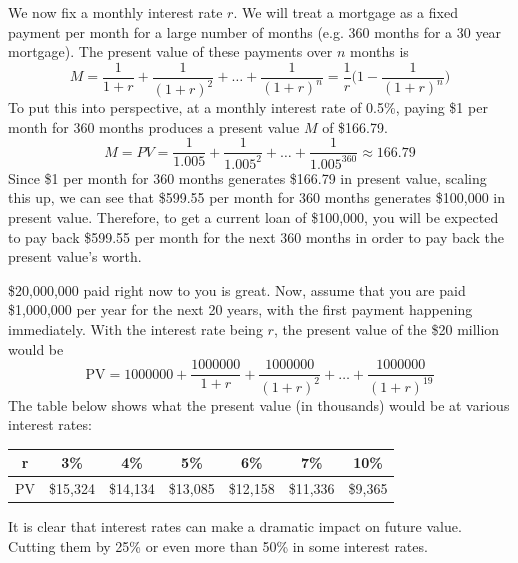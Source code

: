 \documentclass{article}
\begin{document}
    \begin{example}[Mortgages]
      \label{ex:mortgages}
      We now fix a monthly interest rate $r$. We will treat a mortgage as a fixed payment per month for a large number of months (e.g. 360 months for a 30 year mortgage). The present value of these payments over $n$ months is 
      \begin{equation}
        M = \frac{1}{1+r} + \frac{1}{(1+r)^2} + \ldots + \frac{1}{(1+r)^n} = \frac{1}{r} \bigg( 1 - \frac{1}{(1+r)^n}\bigg)
      \end{equation}
      To put this into perspective, at a monthly interest rate of 0.5\%, paying \$1 per month for 360 months produces a present value $M$ of \$166.79. 
      \begin{equation}
        M = PV = \frac{1}{1.005} + \frac{1}{1.005^2} + \ldots + \frac{1}{1.005^360} \approx 166.79
      \end{equation}
      Since \$1 per month for 360 months generates \$166.79 in present value, scaling this up, we can see that \$599.55 per month for 360 months generates \$100,000 in present value. Therefore, to get a current loan of \$100,000, you will be expected to pay back \$599.55 per month for the next 360 months in order to pay back the present value's worth. 
    \end{example}

    \begin{example}
      \label{ex:lump-sum-against-an-annuity}
      \$20,000,000 paid right now to you is great. Now, assume that you are paid \$1,000,000 per year for the next 20 years, with the first payment happening immediately. With the interest rate being $r$, the present value of the \$20 million would be
      \begin{equation}
        \text{PV} = 1000000 + \frac{1000000}{1 + r} + \frac{1000000}{(1+r)^2} + \ldots + \frac{1000000}{(1+r)^{19}}
      \end{equation}
      The table below shows what the present value (in thousands) would be at various interest rates: 
      \begin{center}
      \begin{tabular}{c|c|c|c|c|c|c}
          r &  3\% & 4\% & 5\% & 6\% & 7\% & 10\%\\
          \hline
          PV & \$15,324 & \$14,134 & \$13,085 & \$12,158 & \$11,336 & \$9,365
      \end{tabular}
      \end{center}
      It is clear that interest rates can make a dramatic impact on future value. Cutting them by 25\% or even more than 50\% in some interest rates. 
    \end{example}
\end{document}
